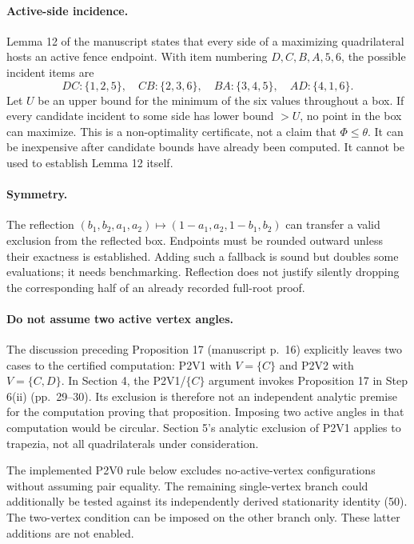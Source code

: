 \documentclass[11pt]{article}
\begin{document}
\paragraph{Active-side incidence.}
Lemma 12 of the manuscript states that every side of a maximizing
quadrilateral hosts an active fence endpoint. With item numbering
\(D,C,B,A,5,6\), the possible incident items are
\[
 DC:\{1,2,5\},\quad CB:\{2,3,6\},\quad
 BA:\{3,4,5\},\quad AD:\{4,1,6\}.
\]
Let \(U\) be an upper bound for the minimum of the six values throughout a
box. If every candidate incident to some side has lower bound \(>U\), no
point in the box can maximize. This is a non-optimality certificate, not a
claim that \(\Phi\le\theta\). It can be inexpensive after candidate bounds
have already been computed. It cannot be used to establish Lemma 12 itself.

\paragraph{Symmetry.}
The reflection
\((b_1,b_2,a_1,a_2)\mapsto(1-a_1,a_2,1-b_1,b_2)\)
can transfer a valid exclusion from the reflected box. Endpoints must be
rounded outward unless their exactness is established.
Adding such a fallback is sound but doubles some evaluations; it needs
benchmarking. Reflection does not justify silently dropping the corresponding
half of an already recorded full-root proof.

\paragraph{Do not assume two active vertex angles.}
The discussion preceding Proposition 17 (manuscript p.~16) explicitly leaves
two cases to the certified computation: P2V1 with $V=\{C\}$ and P2V2 with
$V=\{C,D\}$. In Section 4, the P2V1/$\{C\}$ argument invokes Proposition 17
in Step 6(ii) (pp.~29--30). Its exclusion is therefore not an independent
analytic premise for the computation proving that proposition. Imposing two
active angles in that computation would be circular. Section 5's analytic
exclusion of P2V1 applies to trapezia, not all quadrilaterals under consideration.

The implemented P2V0 rule below excludes no-active-vertex configurations
without assuming pair equality. The remaining single-vertex branch could
additionally be tested against its
independently derived stationarity identity (50). The two-vertex condition
can be imposed on the other branch only. These latter additions are not enabled.
\end{document}
